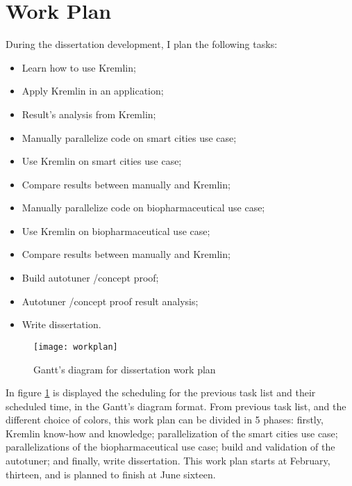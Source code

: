 \section{Work Plan}
During the dissertation development, I plan the following tasks:
\begin{itemize}
    \item Learn how to use Kremlin;
    \item Apply Kremlin in an application;
    \item Result's analysis from Kremlin;
    \item Manually parallelize code on smart cities use case;
    \item Use Kremlin on smart cities use case;
    \item Compare results between manually and Kremlin;
    \item Manually parallelize code on biopharmaceutical use case;
    \item Use Kremlin on biopharmaceutical use case;
    \item Compare results between manually and Kremlin;
    \item Build autotuner /concept proof;
    \item Autotuner /concept proof result analysis;
    \item Write dissertation.
\end{itemize}

\begin{figure}[t]
  \begin{center}
    \leavevmode
    \texttt{[image: workplan]}
    \caption{Gantt's diagram for dissertation work plan}
    \label{fig:plan}
  \end{center}
\end{figure}
In figure \ref{fig:plan} is displayed the scheduling for the previous task list and their scheduled time, in the Gantt's diagram format. From previous task list, and the different choice of colors, this work plan can be divided in 5 phases: firstly, Kremlin know-how and knowledge; parallelization of the smart cities use case; parallelizations of the biopharmaceutical use case; build and validation of the autotuner; and finally, write dissertation. This work plan starts at February, thirteen, and is planned to finish at June sixteen.
